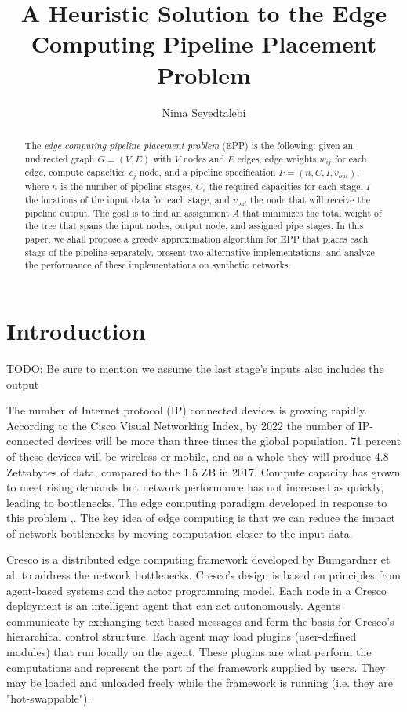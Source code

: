 \documentclass{acmart}
\author{Nima Seyedtalebi}
\title{A Heuristic Solution to the Edge Computing Pipeline Placement Problem}
\begin{document}
	\maketitle
	\doublespacing
	\begin{abstract}
		The \textit{edge computing pipeline placement problem} (EPP) is the following: given an undirected graph $G=(V,E)$ with $V$ nodes and $E$ edges, edge weights $w_{ij}$ for each edge, compute capacities $c_{j}$ node, and a pipeline specification $P = (n,C,I,v_{out})$, where  $n$ is the number of pipeline stages, $C_{s}$ the required capacities for each stage, $I$ the locations of the input data for each stage, and $v_{out}$ the node that will receive the pipeline output. The goal is to find an assignment $A$ that minimizes the total weight of the tree that spans the input nodes, output node, and assigned pipe stages. In this paper, we shall propose a greedy approximation algorithm for EPP that places each stage of the pipeline separately, present two alternative implementations, and analyze the performance of these implementations on synthetic networks.
	\end{abstract}
	
	\section{Introduction}
	
	
	TODO: Be sure to mention we assume the last stage's inputs also includes the output
	
	
	The number of Internet protocol (IP) connected devices is growing rapidly. According to the Cisco Visual Networking Index, by 2022 the number of IP-connected devices will be more than three times the global population. 71 percent of these devices will be wireless or mobile, and as a whole they will produce 4.8 Zettabytes of data, compared to the 1.5 ZB in 2017.\cite{ciscoVNI} Compute capacity has grown to meet rising demands but network performance has not increased as quickly, leading to bottlenecks. The edge computing paradigm developed in response to this problem \cite{edgeEmerge},\cite{edgePromise}. The key idea of edge computing is that we can reduce the impact of network bottlenecks by moving computation closer to the input data.
	
	Cresco is a distributed edge computing framework developed by Bumgardner et al.\cite{bumgardner2016cresco} to address the network bottlenecks. Cresco's design is based on principles from agent-based systems and the actor programming model. Each node in a Cresco deployment is an intelligent agent that can act autonomously. Agents communicate by exchanging text-based messages and form the basis for Cresco's hierarchical control structure. Each agent may load plugins (user-defined modules) that run locally on the agent. These plugins are what perform the computations and represent the part of the framework supplied by users. They may be loaded and unloaded freely while the framework is running (i.e. they are "hot-swappable").
	
\end{document}
